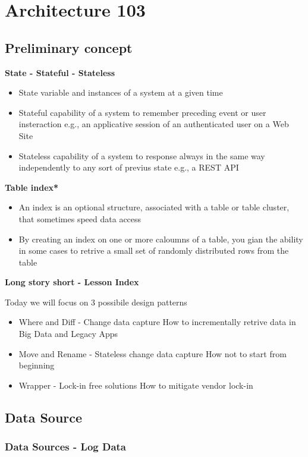 \section{Architecture 103}

\subsection{Preliminary concept}

\textbf{State - Stateful - Stateless}

\begin{itemize}
	\item State
	variable and instances of a system at a given time
	\item Stateful
	capability of a system to remember preceding event or user insteraction
	e.g., an applicative session of an authenticated user on a Web Site
	\item Stateless
	capability of a system to response always in the same way independently to any sort of previus state
	e.g., a REST API
\end{itemize}

\textbf{Table index*}

\begin{itemize}
	\item An index is an optional structure, associated with a table or table cluster, that sometimes speed data access
	\item By creating an index on one or more caloumns of a table, you gian the ability in some cases to retrive a small set of randomly distributed rows from the table
\end{itemize}

\textbf{Long story short - Lesson Index}

Today we will focus on 3 possibile design patterns
\begin{itemize}
	\item Where and Diff - Change data capture
	How to incrementally retrive data in Big Data and Legacy Apps
	\item Move and Rename - Stateless change data capture
	How not to start from beginning
	\item Wrapper - Lock-in free solutions
	How to mitigate vendor lock-in
\end{itemize}

\subsection{Data Source}

\subsubsection{Data Sources - Log Data}




